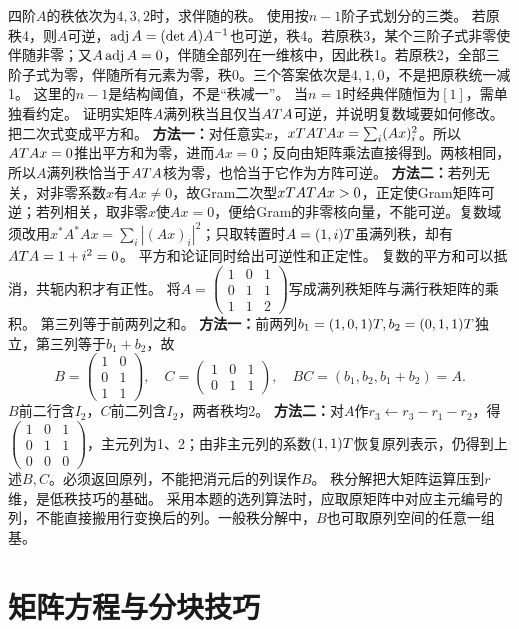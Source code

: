 {四阶$A$的秩依次为$4,3,2$时，求伴随的秩。}
{使用按$n-1$阶子式划分的三类。}
{若原秩4，则$A$可逆，$\operatorname{adj} A=(\det A)A^{-1}$也可逆，秩4。若原秩3，某个三阶子式非零使伴随非零；又$A\operatorname{adj} A=0$，伴随全部列在一维核中，因此秩1。若原秩2，全部三阶子式为零，伴随所有元素为零，秩0。三个答案依次是$4,1,0$，不是把原秩统一减1。}
{这里的$n-1$是结构阈值，不是“秩减一”。}
{当$n=1$时经典伴随恒为$[1]$，需单独看约定。}
{证明实矩阵$A$满列秩当且仅当$AT A$可逆，并说明复数域要如何修改。}
{把二次式变成平方和。}
{\textbf{方法一：}对任意实$x$，$xT AT Ax=\sum_i(Ax)_i^2$。所以$AT Ax=0$推出平方和为零，进而$Ax=0$；反向由矩阵乘法直接得到。两核相同，所以$A$满列秩恰当于$AT A$核为零，也恰当于它作为方阵可逆。
\textbf{方法二：}若列无关，对非零系数$x$有$Ax\ne0$，故Gram二次型$xT AT Ax>0$，正定使Gram矩阵可逆；若列相关，取非零$x$使$Ax=0$，便给Gram的非零核向量，不能可逆。复数域须改用$x^*A^*Ax=\sum_i|(Ax)_i|^2$；只取转置时$A=(1,i)T$虽满列秩，却有$AT A=1+i^2=0$。}
{平方和论证同时给出可逆性和正定性。}
{复数的平方和可以抵消，共轭内积才有正性。}
{将$A=\begin{pmatrix}1&0&1\\0&1&1\\1&1&2\end{pmatrix}$写成满列秩矩阵与满行秩矩阵的乘积。}
{第三列等于前两列之和。}
{\textbf{方法一：}前两列$b_1=(1,0,1)T,b_2=(0,1,1)T$独立，第三列等于$b_1+b_2$，故
\[B=\begin{pmatrix}1&0\\0&1\\1&1\end{pmatrix},\quad C=\begin{pmatrix}1&0&1\\0&1&1\end{pmatrix},\quad BC=(b_1,b_2,b_1+b_2)=A.\]
$B$前二行含$I_2$，$C$前二列含$I_2$，两者秩均2。
\textbf{方法二：}对$A$作$r_3\leftarrow r_3-r_1-r_2$，得$\begin{pmatrix}1&0&1\\0&1&1\\0&0&0\end{pmatrix}$，主元列为1、2；由非主元列的系数$(1,1)T$恢复原列表示，仍得到上述$B,C$。必须返回原列，不能把消元后的列误作$B$。}
{秩分解把大矩阵运算压到$r$维，是低秩技巧的基础。}
{采用本题的选列算法时，应取原矩阵中对应主元编号的列，不能直接搬用行变换后的列。一般秩分解中，$B$也可取原列空间的任意一组基。}


\section{矩阵方程与分块技巧}
